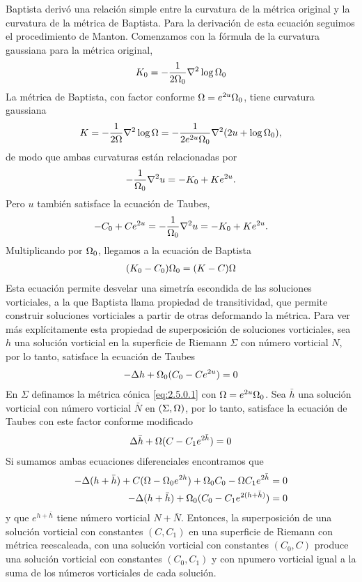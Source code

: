 Baptista derivó una relación simple entre la curvatura de la métrica original y la curvatura de la métrica de Baptista. Para la derivación de esta ecuación seguimos el procedimiento de Manton. Comenzamos con la fórmula de la curvatura gaussiana para la métrica original,
\begin{align}
    K_0 = -\frac{1}{2\Omega_0}\nabla^2\log\Omega_0\label{2.5.0.2}
\end{align}
La métrica de Baptista, con factor conforme $\Omega=e^{2u}\Omega_0$, tiene curvatura gaussiana
\begin{align*}
    K = -\frac{1}{2\Omega}\nabla^2\log\Omega = -\frac{1}{2e^{2u}\Omega_0}\nabla^2(2u+\log\Omega_0),
\end{align*}
de modo que ambas curvaturas están relacionadas por 
\begin{align*}
    -\frac{1}{\Omega_0}\nabla^2u=-K_0+Ke^{2u}.
\end{align*}
Pero $u$ también satisface la ecuación de Taubes,
\begin{align*}
    -C_0+Ce^{2u}=-\frac{1}{\Omega_0}\nabla^2u=-K_0+Ke^{2u}.
\end{align*}
Multiplicando por $\Omega_0$, llegamos a la ecuación de Baptista
\begin{align}
    (K_0-C_0)\Omega_0=(K-C)\Omega\label{2.5.0.3}
\end{align}
Esta ecuación permite desvelar una simetría escondida de las soluciones vorticiales, a la que Baptista llama propiedad de transitividad, que permite construir soluciones vorticiales a partir de otras deformando la métrica. Para ver más explícitamente esta propiedad de superposición de soluciones vorticiales, sea $h$ una solución vorticial en la superficie de Riemann $\Sigma$ con número vorticial $N$, por lo tanto, satisface la ecuación de Taubes
\begin{align*}
    -\Delta h+\Omega_0(C_0-Ce^{2u}) =0
\end{align*}
En $\Sigma$ definamos la métrica cónica \eqref{eq:2.5.0.1} con $\Omega=e^{2u}\Omega_0$. Sea $\bar h$ una solución vorticial con número vorticial $\bar N$ en $(\Sigma,\Omega)$, por lo tanto, satisface la ecuación de Taubes con este factor conforme modificado
\begin{align*}
    \Delta\bar h+\Omega(C-C_1e^{2\bar h}) =0
\end{align*}
Si sumamos ambas ecuaciones diferenciales encontramos que
\begin{align*}
    -\Delta(h+\bar h)+C(\Omega-\Omega_0 e^{2h})+\Omega_0 C_0-\Omega C_1 e^{2\bar h} &= 0\\
    -\Delta(h+\bar h)+\Omega_0(C_0-C_1 e^{2(h+\bar h)}) &= 0
\end{align*}
 y que $e^{h+\bar h}$ tiene número vorticial $N+\bar N$. Entonces, la superposición de una solución vorticial con constantes $(C,C_1)$ en una superficie de Riemann con métrica reescaleada, con una solución vorticial con constantes $(C_0,C)$ produce una solución vorticial con constantes $(C_0,C_1)$ y con npumero vorticial igual a la suma de los números vorticiales de cada solución.
 
